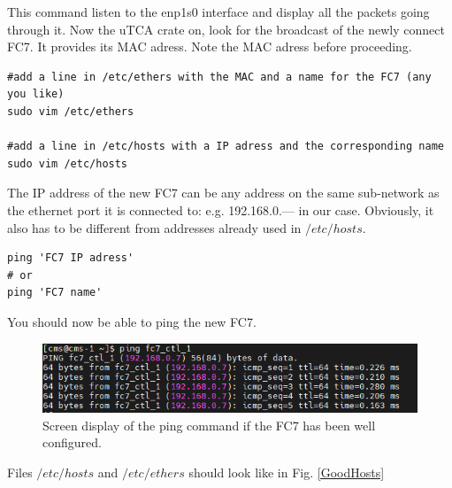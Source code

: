 \documentclass[10pt,a4paper]{article}
\begin{document}
This command listen to the enp1s0 interface and display all the packets going through it.
Now the uTCA crate on,  look for the broadcast of the newly connect FC7. It provides its MAC  adress. Note the MAC adress before proceeding.

\begin{framed}
\begin{verbatim}
#add a line in /etc/ethers with the MAC and a name for the FC7 (any you like)
sudo vim /etc/ethers 

#add a line in /etc/hosts with a IP adress and the corresponding name
sudo vim /etc/hosts  
\end{verbatim}
\end{framed}

The IP address of the new FC7 can be any address on the same sub-network as the ethernet port it is connected to: e.g. 192.168.0.---  in our case. Obviously, it also has to be different from addresses already used in $/etc/hosts $.

\begin{framed}
\begin{verbatim}
ping 'FC7 IP adress'
# or
ping 'FC7 name'
\end{verbatim}
\end{framed}

You should now be able to ping the new FC7. 

\begin{figure}[h!]
\centering
 \includegraphics[width=0.8\linewidth]{PingResponse.png} 
  \caption{Screen display of the ping command if the FC7 has been well configured.}
  \label{GoodPing2}
\end{figure}

Files $/etc/hosts$ and $/etc/ethers$ should look like in Fig. \ref{GoodHosts}
\end{document}
